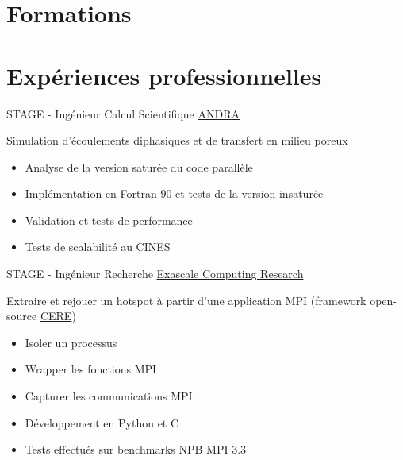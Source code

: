 \documentclass[10pt,a4paper,sans]{moderncv}
\begin{document}
\makecvtitle

\section{Formations}

\section{Expériences professionnelles}
{STAGE - Ingénieur Calcul Scientifique}
{\href{http://andra.fr/}{ANDRA}}{}{}
{Simulation d'écoulements diphasiques et de transfert en milieu poreux
\begin{itemize}
\item Analyse de la version saturée du code parallèle
\item Implémentation en Fortran 90 et tests de la version insaturée
\item Validation et tests de performance
\item Tests de scalabilité au CINES
\end{itemize}}

{STAGE - Ingénieur Recherche}
{\href{http://www.exascale-computing.eu/}{Exascale Computing Research}}{}{}
{Extraire et rejouer un hotspot à partir d'une application MPI (framework open-source \href{https://benchmark-subsetting.github.io/cere/}{CERE})
\begin{itemize}
\item Isoler un processus
\item Wrapper les fonctions MPI
\item Capturer les communications MPI
\item Développement en Python et C
\item Tests effectués sur benchmarks NPB MPI 3.3
\end{itemize}}
\end{document}
